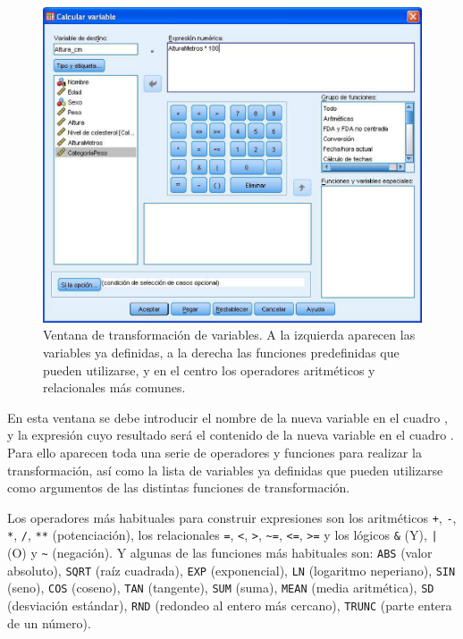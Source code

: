 \begin{figure}[h!]
\begin{center}
\includegraphics[scale=0.6]{introduccion_spss/img/transformacion}
\caption{Ventana de transformación de variables. A la izquierda aparecen las variables ya definidas, a la derecha las funciones predefinidas que pueden utilizarse, y en el centro los operadores aritméticos y relacionales más comunes.}
\label{g:transformacion}
\end{center}
\end{figure}

En esta ventana se debe introducir el nombre de la nueva variable en el cuadro , y la expresión cuyo resultado será el contenido de la nueva variable en el cuadro . Para ello aparecen toda una serie de operadores y funciones para realizar la transformación, así como la lista de variables ya definidas que pueden utilizarse como argumentos de las distintas funciones de transformación.

Los operadores más habituales para construir expresiones son los aritméticos \texttt{+}, \texttt{-}, \texttt{*}, \texttt{/}, \texttt{**} (potenciación), los relacionales \texttt{=}, \texttt{<}, \texttt{>}, \verb"~=", \texttt{<=}, \texttt{>=} y los lógicos \texttt{\&} (Y), \texttt{|} (O) y \verb"~" (negación). Y algunas de las funciones más habituales son: \texttt{ABS} (valor absoluto), \texttt{SQRT} (raíz cuadrada), \texttt{EXP} (exponencial), \texttt{LN} (logaritmo neperiano), \texttt{SIN} (seno), \texttt{COS} (coseno), \texttt{TAN} (tangente), \texttt{SUM} (suma), \texttt{MEAN} (media aritmética), \texttt{SD} (desviación estándar), \texttt{RND} (redondeo al entero más cercano), \texttt{TRUNC} (parte entera de un número). 

